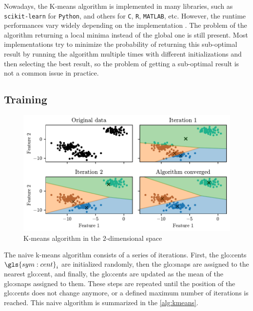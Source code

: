 Nowadays, the K-means algorithm is implemented in many libraries, such as \texttt{scikit-learn} for \texttt{Python}, and others for \texttt{C}, \texttt{R}, \texttt{MATLAB}, etc. However, the runtime performances vary widely depending on the implementation \cite{Kmeans-performances-Kriegel2017}. The problem of the algorithm returning a local minima instead of the global one is still present. Most implementations try to minimize the probability of returning this sub-optimal result by running the algorithm multiple times with different initializations and then selecting the best result, so the problem of getting a sub-optimal result is not a common issue in practice.

\subsection{Training}

\begin{figure}[htbp]
  \centering
  \includegraphics[width=\textwidth]{images/Kmeans/Kmeans_vornoi.pdf}
  \caption{K-means algorithm in the $2$-dimensional space}
  \label{fig:kmeans_vornoi}
\end{figure}

 The naive k-means algorithm consists of a series of iterations. First, the {\gls{glo:cent}}s $\gls{sym:cent}_i$ are initialized randomly, then the {\gls{glo:snap}}s are assigned to the nearest {\gls{glo:cent}}, and finally, the {\gls{glo:cent}}s are updated as the mean of the {\gls{glo:snap}}s assigned to them. These steps are repeated until the position of the {\gls{glo:cent}}s does not change anymore, or a defined maximum number of iterations is reached. This naive algorithm is summarized in the \autoref{alg:kmeans}.

